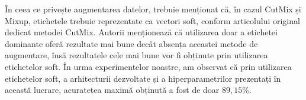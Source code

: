 În ceea ce privește augmentarea datelor, trebuie menționat că, în cazul CutMix și Mixup, etichetele trebuie reprezentate ca vectori soft, conform articolului original dedicat metodei CutMix. Autorii menționează că utilizarea doar a etichetei dominante oferă rezultate mai bune decât absența aceastei metode de augmentare, însă rezultatele cele mai bune vor fi obținute prin utilizarea etichetelor soft. În urma experimentelor noastre, am observat că prin utilizarea etichetelor soft, a arhitecturii dezvoltate și a hiperparametrilor prezentați în această lucrare, acuratețea maximă obținută a fost de doar $89,15\%$.